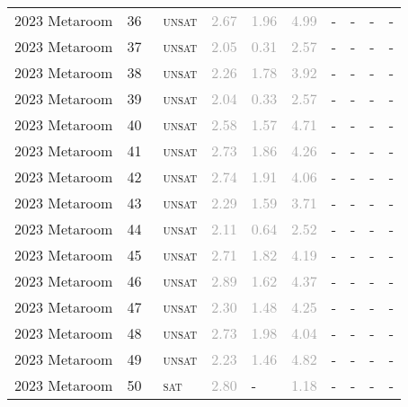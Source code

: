 \begin{center}
{\begin{longtable}{@{}llllllllll@{}}
2023 Metaroom & 36 & ~\textsc{unsat} & \textcolor{darkgray}{2.67} & \textcolor{darkgray}{1.96} & \textcolor{darkgray}{4.99} & - & - & - & - \\
2023 Metaroom & 37 & ~\textsc{unsat} & \textcolor{darkgray}{2.05} & \textcolor{darkgray}{0.31} & \textcolor{darkgray}{2.57} & - & - & - & - \\
2023 Metaroom & 38 & ~\textsc{unsat} & \textcolor{darkgray}{2.26} & \textcolor{darkgray}{1.78} & \textcolor{darkgray}{3.92} & - & - & - & - \\
2023 Metaroom & 39 & ~\textsc{unsat} & \textcolor{darkgray}{2.04} & \textcolor{darkgray}{0.33} & \textcolor{darkgray}{2.57} & - & - & - & - \\
2023 Metaroom & 40 & ~\textsc{unsat} & \textcolor{darkgray}{2.58} & \textcolor{darkgray}{1.57} & \textcolor{darkgray}{4.71} & - & - & - & - \\
2023 Metaroom & 41 & ~\textsc{unsat} & \textcolor{darkgray}{2.73} & \textcolor{darkgray}{1.86} & \textcolor{darkgray}{4.26} & - & - & - & - \\
2023 Metaroom & 42 & ~\textsc{unsat} & \textcolor{darkgray}{2.74} & \textcolor{darkgray}{1.91} & \textcolor{darkgray}{4.06} & - & - & - & - \\
2023 Metaroom & 43 & ~\textsc{unsat} & \textcolor{darkgray}{2.29} & \textcolor{darkgray}{1.59} & \textcolor{darkgray}{3.71} & - & - & - & - \\
2023 Metaroom & 44 & ~\textsc{unsat} & \textcolor{darkgray}{2.11} & \textcolor{darkgray}{0.64} & \textcolor{darkgray}{2.52} & - & - & - & - \\
2023 Metaroom & 45 & ~\textsc{unsat} & \textcolor{darkgray}{2.71} & \textcolor{darkgray}{1.82} & \textcolor{darkgray}{4.19} & - & - & - & - \\
2023 Metaroom & 46 & ~\textsc{unsat} & \textcolor{darkgray}{2.89} & \textcolor{darkgray}{1.62} & \textcolor{darkgray}{4.37} & - & - & - & - \\
2023 Metaroom & 47 & ~\textsc{unsat} & \textcolor{darkgray}{2.30} & \textcolor{darkgray}{1.48} & \textcolor{darkgray}{4.25} & - & - & - & - \\
2023 Metaroom & 48 & ~\textsc{unsat} & \textcolor{darkgray}{2.73} & \textcolor{darkgray}{1.98} & \textcolor{darkgray}{4.04} & - & - & - & - \\
2023 Metaroom & 49 & ~\textsc{unsat} & \textcolor{darkgray}{2.23} & \textcolor{darkgray}{1.46} & \textcolor{darkgray}{4.82} & - & - & - & - \\
2023 Metaroom & 50 & ~\textsc{sat} & \textcolor{darkgray}{2.80} & - & \textcolor{darkgray}{1.18} & - & - & - & - \\

\end{longtable}}
\end{center}
